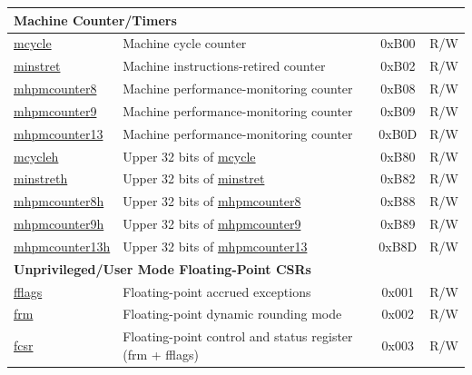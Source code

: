 \begin{longtable}{ | p{4.0cm} | p{8.4cm} | c | l | }
\multicolumn{4}{|l|}{\textbf{Machine Counter/Timers}} \\\hline
\hyperref[regdesc:MCYCLE]{mcycle} & Machine cycle counter & 0xB00 & R/W \\\hline
\hyperref[regdesc:MINSTRET]{minstret} & Machine instructions-retired counter & 0xB02 & R/W \\\hline
\hyperref[regdesc:MHPMCOUNTER8]{mhpmcounter8} & Machine performance-monitoring counter & 0xB08 & R/W \\\hline
\hyperref[regdesc:MHPMCOUNTER9]{mhpmcounter9} & Machine performance-monitoring counter & 0xB09 & R/W \\\hline
\hyperref[regdesc:MHPMCOUNTER13]{mhpmcounter13} & Machine performance-monitoring counter & 0xB0D & R/W \\\hline
\hyperref[regdesc:MCYCLEH]{mcycleh} & Upper 32 bits of \hyperref[regdesc:MCYCLE]{mcycle} & 0xB80 & R/W \\\hline
\hyperref[regdesc:MINSTRETH]{minstreth} & Upper 32 bits of \hyperref[regdesc:MINSTRET]{minstret}  & 0xB82 & R/W \\\hline
\hyperref[regdesc:MHPMCOUNTER8H]{mhpmcounter8h} & Upper 32 bits of \hyperref[regdesc:MHPMCOUNTER8]{mhpmcounter8} & 0xB88 & R/W \\\hline
\hyperref[regdesc:MHPMCOUNTER9H]{mhpmcounter9h} & Upper 32 bits of \hyperref[regdesc:MHPMCOUNTER9]{mhpmcounter9} & 0xB89 & R/W \\\hline
\hyperref[regdesc:MHPMCOUNTER13H]{mhpmcounter13h} & Upper 32 bits of \hyperref[regdesc:MHPMCOUNTER13]{mhpmcounter13} & 0xB8D & R/W \\\hline

\multicolumn{4}{|l|}{\textbf{Unprivileged/User Mode Floating-Point CSRs}} \\\hline
\hyperref[regdesc:FFLAGS]{fflags} & Floating-point accrued exceptions & 0x001 & R/W \\\hline
\hyperref[regdesc:FRM]{frm} & Floating-point dynamic rounding mode & 0x002 & R/W \\\hline
\hyperref[regdesc:FCSR]{fcsr} & Floating-point control and status register (frm + fflags) & 0x003 & R/W \\\hline


\end{longtable}
